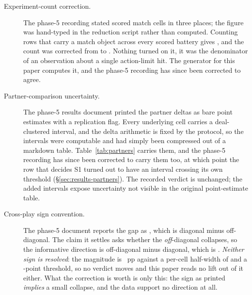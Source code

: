 \begin{description}
\item[Experiment-count correction.] The phase-5 recording stated
  \vsevenScoredCellsRecorded{} scored match cells in three places; the figure was hand-typed in the
  reduction script rather than computed. Counting rows that carry a match object across every scored
  battery gives \vsevenScoredCells{}, and the count was corrected from
  \vsevenScoredCellsRecorded{} to \vsevenScoredCells{}. Nothing turned on it, it was the denominator
  of an observation about a single action-limit hit. The generator for this paper computes it, and
  the phase-5 recording has since been corrected to agree.

\item[Partner-comparison uncertainty.]
  \label{app:corrections-intervals}
  The phase-5 results document printed the partner deltas as bare point estimates with a replication
  flag. Every underlying cell carries a deal-clustered interval, and the delta arithmetic is fixed by
  the protocol, so the intervals were computable and had simply been compressed out of a markdown
  table. Table~\ref{tab:partners} carries them, and the phase-5 recording has since been corrected to
  carry them too, at which point the row that decides S1 turned out to have an interval crossing
  its own threshold (\S\ref{sec:results-partners}). The recorded verdict is unchanged; the added
  intervals expose uncertainty not visible in the original point-estimate table.

\item[Cross-play sign convention.] The phase-5 document reports the gap as \vsevenXpGapRecorded{}, which is diagonal minus
  off-diagonal. The claim it settles asks whether the \emph{off}-diagonal collapses, so the informative direction is off-diagonal minus diagonal, which is \vsevenXpGap{}.
  \emph{Neither sign is resolved}: the magnitude is \vsevenXpGapAbs{}~pp against a per-cell
  half-width of \vsevenXpHalfWidth{} and a \vsevenStwoThreshold{}-point threshold, so no verdict
  moves and this paper reads no lift out of it either. What the correction is worth is only this:
  the sign as printed \emph{implies} a small collapse, and the data support no direction at all.


\end{description}
